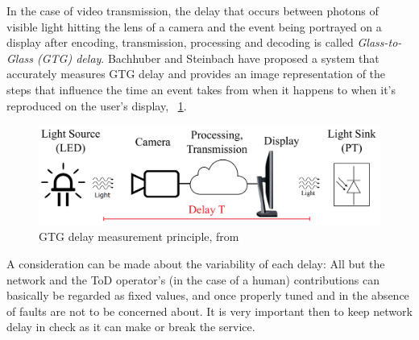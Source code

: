 In the case of video transmission, the delay that occurs between photons of visible light hitting the lens of a camera and the event being portrayed on a display after encoding, transmission, processing and decoding is called \textit{Glass-to-Glass (GTG) delay}. Bachhuber and Steinbach \cite{gtg_delay} have proposed a system that accurately measures GTG delay and provides an image representation of the steps that influence the time an event takes from when it happens to when it's reproduced on the user's display, \figurename~\ref{fig:gtg_delay_measurement_principle}.
\begin{figure}[h]
    \centering
    \includegraphics[width=\textwidth]{images/tele_operated_driving/gtg_delay_measurement_principle}
    \caption{GTG delay measurement principle, from \cite{gtg_delay}}
    \label{fig:gtg_delay_measurement_principle}
\end{figure}

A consideration can be made about the variability of each delay: All but the network and the ToD operator's (in the case of a human) contributions can basically be regarded as fixed values, and once properly tuned and in the absence of faults are not to be concerned about. It is very important then to keep network delay in check as it can make or break the service.

